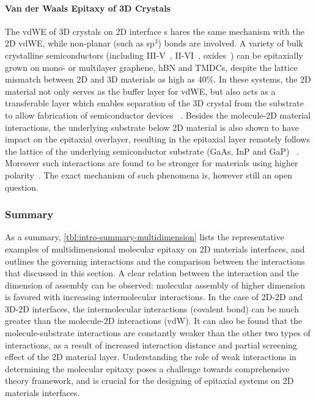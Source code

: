 \paragraph{Van der Waals Epitaxy of 3D Crystals}
\label{sec:orgeb0161b}

The vdWE of 3D crystals on 2D interface s
hares the same mechanism with the 2D
vdWE, while non-planar (such as sp\(^{\text{3}}\)) bonds are involved.
%
A variety of bulk crystalline semiconductors (including
III-V~\cite{Alaskar_2015_GaAs_gr_Si_theor,Kim_2017_remote_epi_Gr,Nepal_2013_GaN_gr,Kim_2014_direct_vdw_GaN_gr,Makimoto_2012_InGaN_hBN},
II-VI~\cite{Loeher_1994_vdw_epi_CdS_MoTe,Loeher_1996_CdTe_MoWTe},
oxides~\cite{Oh_2014_ZnO_hBN,Chung_2010_GaN_ZnO_gr})
can be epitaxially grown on mono- or multilayer graphene, hBN and TMDCs, despite the lattice mismatch between 2D and 3D materials as high as 40\%.
%
In
these systems, the 2D material not only serves as the buffer layer for
vdWE, but also acts as a transferable layer which enables separation
of the 3D crystal from the substrate to allow fabrication of
semiconductor devices
~\cite{Makimoto_2012_InGaN_hBN,Kobayashi_2012_GaN_hBN,Kim_2014_direct_vdw_GaN_gr,Kim_2017_remote_epi_Gr}.
%
Besides the molecule-2D material interactions, the underlying
substrate below 2D material is also shown to have impact on the
epitaxial overlayer, resulting in the epitaxial layer remotely follows
the  lattice of the underlying semiconductor substrate (GaAs, InP and GaP)
~\cite{Kim_2017_remote_epi_Gr}. Moreover such interactions are found to be stronger for materials using higher polarity~\cite{Kong_2018_vdw_polar}.
%
The exact mechanism of such phenomena is, however still an open question.


\subsubsection{Summary}
\label{sec:org0b4290f}

As a summary, \autoref{tbl:intro-summary-multidimension} lists the
representative examples of multidimensional molecular epitaxy on 2D
materials interfaces, and outlines the governing interactions and the
comparison between the interactions that discussed in this section. A
clear relation between the interaction and the dimension of assembly
can be observed: molecular assembly of higher dimension is favored
with increasing intermolecular interactions. In the case of 2D-2D and
3D-2D interfaces, the intermolecular interactions (covalent bond) can
be much greater than the molecule-2D interactions (vdW). It can also
be found that the molecule-substrate interactions are constantly
weaker than the other two types of interactions, as a result of
increased interaction distance and partial screening effect of the 2D
material layer. Understanding the role of weak interactions in
determining the molecular epitaxy poses a challenge towards
comprehensive theory framework, and is crucial for the designing of
epitaxial systems on 2D materials interfaces.


